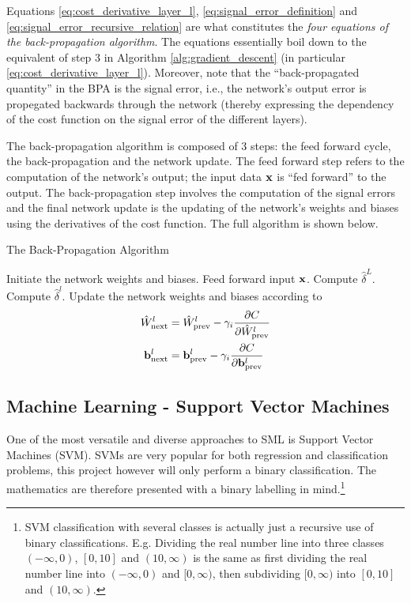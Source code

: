 \documentclass[nofootinbib,reprint,english]{revtex4-1}
\begin{document}
Equations \eqref{eq:cost_derivative_layer_l}, \eqref{eq:signal_error_definition} and \eqref{eq:signal_error_recursive_relation} are what constitutes the \emph{four equations of the back-propagation algorithm}. The equations essentially boil down to the equivalent of step 3 in Algorithm \ref{alg:gradient_descent} (in particular \eqref{eq:cost_derivative_layer_l}). Moreover, note that the ``back-propagated quantity'' in the BPA is the signal error, i.e., the network's output error is propegated backwards through the network (thereby expressing the dependency of the cost function on the signal error of the different layers).

The back-propagation algorithm is composed of 3 steps: the feed forward cycle, the back-propagation and the network update. The feed forward step refers to the computation of the network's output; the input data \(\vb{x}\) is ``fed forward'' to the output. The back-propagation step involves the computation of the signal errors and the final network update is the updating of the network's weights and biases using the derivatives of the cost function. The full algorithm is shown below. 

\begin{algorithm}[H]
\caption{The Back-Propagation Algorithm}\label{alg:back_propagation}
\begin{algorithmic}[1]
\State Initiate the network weights and biases.
	\State Feed forward input \(\vb{x}\).
	\State Compute \(\hat{\delta}^L\).
		\State Compute \(\hat{\delta}^l\).
	\EndFor
	\State Update the network weights and biases according to
\begin{align*}
\hat{W}^l_\text{next}&=\hat{W}^l_\text{prev}-\gamma_i\pdv{C}{\hat{W}^l_\text{prev}}\\
\vb{b}^l_\text{next}&=\vb{b}^l_\text{prev}-\gamma_i\pdv{C}{\vb{b}^l_\text{prev}}
\end{align*}
\EndFor
\end{algorithmic}
\end{algorithm}

\subsection{Machine Learning - Support Vector Machines}
One of the most versatile and diverse approaches to SML is Support Vector Machines (SVM). SVMs are very popular for both regression and classification problems, this project however will only perform a binary classification. The mathematics are therefore presented with a binary labelling in mind.\footnote{SVM classification with several classes is actually just a recursive use of binary classifications. E.g. Dividing the real number line into three classes \((-\infty,0)\), \([0,10]\) and \((10,\infty)\) is the same as first dividing the real number line into \((-\infty,0)\) and \([0,\infty)\), then subdividing \([0,\infty)\) into \([0,10]\) and \((10,\infty)\).}
\end{document}
